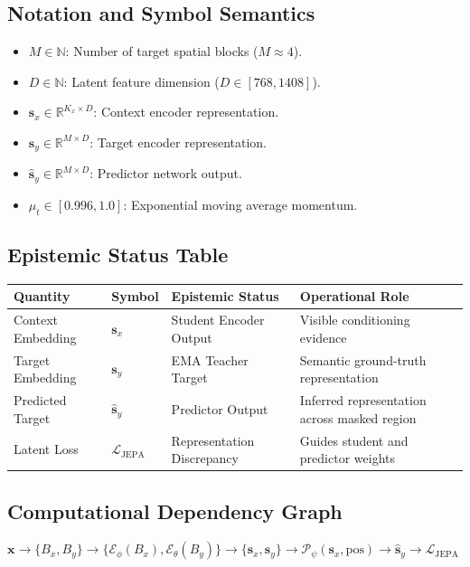 \documentclass[11pt,a4paper]{article}
\theoremstyle{definition}
\begin{document}
\subsection{Notation and Symbol Semantics}
\begin{itemize}
    \item $M \in \mathbb{N}$: Number of target spatial blocks ($M \approx 4$).
    \item $D \in \mathbb{N}$: Latent feature dimension ($D \in [768, 1408]$).
    \item $\mathbf{s}_x \in \mathbb{R}^{K_x \times D}$: Context encoder representation.
    \item $\mathbf{s}_y \in \mathbb{R}^{M \times D}$: Target encoder representation.
    \item $\hat{\mathbf{s}}_y \in \mathbb{R}^{M \times D}$: Predictor network output.
    \item $\mu_t \in [0.996, 1.0]$: Exponential moving average momentum.
\end{itemize}

\subsection{Epistemic Status Table}
\begin{table}[h]
\centering
\small
\begin{tabular}{@{}llll@{}}
\toprule
\textbf{Quantity} & \textbf{Symbol} & \textbf{Epistemic Status} & \textbf{Operational Role} \\
\midrule
Context Embedding & $\mathbf{s}_x$ & Student Encoder Output & Visible conditioning evidence \\
Target Embedding & $\mathbf{s}_y$ & EMA Teacher Target & Semantic ground-truth representation \\
Predicted Target & $\hat{\mathbf{s}}_y$ & Predictor Output & Inferred representation across masked region \\
Latent Loss & $\mathcal{L}_{\text{JEPA}}$ & Representation Discrepancy & Guides student and predictor weights \\
\bottomrule
\end{tabular}
\end{table}

\subsection{Computational Dependency Graph}
{\centering
$\mathbf{x} \longrightarrow \{B_x, B_y\} \longrightarrow \{\mathcal{E}_\phi(B_x), \mathcal{E}_\theta(B_y)\} \longrightarrow \{\mathbf{s}_x, \mathbf{s}_y\} \longrightarrow \mathcal{P}_\psi(\mathbf{s}_x, \text{pos}) \longrightarrow \hat{\mathbf{s}}_y \longrightarrow \mathcal{L}_{\text{JEPA}}$
\par}
\end{document}
